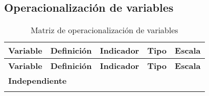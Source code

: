 \begin{landscape} %
\section{Operacionalización de variables}

\begin{longtable}{p{3.5cm}p{6.5cm}p{5cm}p{3cm}p{2.5cm}}
    \caption{Matriz de operacionalización de variables} 
    \label{tab:matriz_operacionalizacion} \\

    \hline
    \textbf{Variable} & \textbf{Definición} & \textbf{Indicador} & \textbf{Tipo} & \textbf{Escala} \\
    \hline
    \endfirsthead

    \hline
    \textbf{Variable} & \textbf{Definición} & \textbf{Indicador} & \textbf{Tipo} & \textbf{Escala} \\
    \hline
    \multicolumn{5}{l}{\textbf{Independiente}} \\ %
    \hline
    \endhead

    \hline
    \endfoot

    \hline
    \endlastfoot


\end{longtable}
\end{landscape}
